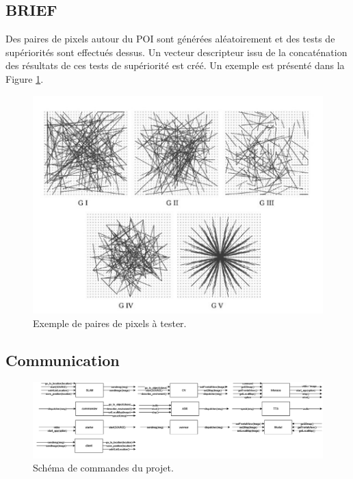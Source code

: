 \documentclass[11pt]{article}
\begin{document}
    \subsection*{BRIEF}
      Des paires de pixels autour du POI sont générées aléatoirement et des tests de supériorités sont effectués dessus. 
      Un vecteur descripteur issu de la concaténation des résultats de ces tests de supériorité est créé. Un exemple est présenté 
      dans la Figure \ref{fig:Paires}.

      \begin{figure}[hbt]  
        \includegraphics[width=\textwidth]{Paires.png}    
        \caption{Exemple de paires de pixels à tester.}
        \label{fig:Paires}
      \end{figure}          
      
    \clearpage

    \subsection*{Communication}    
      \begin{figure}[hbt]  
        \includegraphics[width=\textwidth]{Schéma1.png}    
        \caption{Schéma de commandes du projet.}
        \label{fig:Schema1}
      \end{figure} 
      
\end{document}
